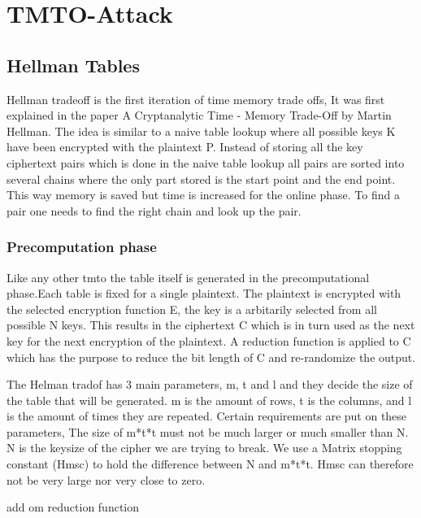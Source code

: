 \chapter{TMTO-Attack}

\label{ch:tmto}

\newpage
\section{Hellman Tables}
\label{sec:hmtheory}
Hellman tradeoff is the first iteration of time memory trade offs, It was first explained in the paper A Cryptanalytic Time - Memory Trade-Off by Martin Hellman.
The idea is similar to a naive table lookup where all possible keys K have been encrypted with the plaintext P. Instead of storing all the key ciphertext pairs which is done in the naive table lookup all pairs are sorted into several chains where the only part stored is the start point and the end point. This way memory is saved but time is increased for the online phase. To find a pair one needs to find the right chain and look up the pair.


\subsection*{Precomputation phase}
Like any other tmto the table itself is generated in the precomputational phase.Each table is fixed for a single plaintext. The plaintext is encrypted with the selected encryption function E, the key is a arbitarily selected from all possible N keys. This results in the ciphertext C which is in turn used as the next key for the next encryption of the plaintext. A reduction function is applied to C which has the purpose to reduce the bit length of C and re-randomize the output.

The Helman tradof has 3 main parameters, m, t and l and they decide the size of the table that will be generated.
m is the amount of rows, t is the columns, and l is the amount of times they are repeated.
Certain requirements are put on these parameters, The size of m*t*t must not be much larger or much smaller than N.
N is the keysize of the cipher we are trying to break. We use a Matrix stopping constant (Hmsc) to hold the difference between N and m*t*t. Hmsc can therefore not be very large nor very close to zero.

add om reduction function

